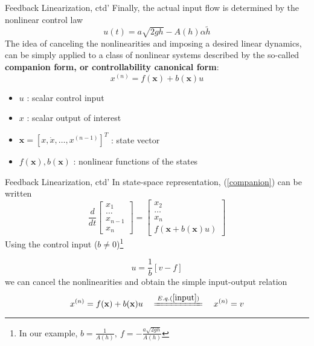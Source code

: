 \documentclass{beamer}
\begin{document}
  
  \begin{frame}{Feedback Linearization, ctd'}
  Finally, the actual input flow is determined by the nonlinear control law
  $$ u(t) = a\sqrt{2gh} - A(h)\alpha \widetilde{h} $$
    The idea of canceling the nonlinearities and imposing a desired linear dynamics, can be simply applied to a class of nonlinear systems described by the so-called \textbf{companion form, or controllability canonical form}: 
    \begin{equation}\label{companion}
      x^{(n)} = f(\textbf{x}) + b(\textbf{x})u
    \end{equation}
    \vspace{-15pt}
    \begin{itemize}
      \item $u$ : scalar control input
      \item $x$ : scalar output of interest
      \item $\textbf{x} = \left[ x,\dot{x},\dots,x^{(n-1)}\right]^{T}$ : state vector
      \item $f(\textbf{x}), b(\textbf{x})$ : nonlinear functions of the states
    \end{itemize}
  \end{frame}
  
  
  \begin{frame}{Feedback Linearization, ctd'}
  In state-space representation, (\ref{companion}) can be written
  $$
  \frac{d}{dt}\left[\begin{array}{c}
                      x_{1} \\
                      \dots \\
                      x_{n-1} \\
                      x_{n}
                    \end{array}\right] = \left[\begin{array}{c}
                                                 x_{2} \\
                                                 \dots \\
                                                 x_{n} \\
                                                 f(\textbf{x}+b(\textbf{x})u)
                                               \end{array}\right]
  $$
  Using the control input ($b \neq 0$)\footnote{In our example, $b=\frac{1}{A(h)}, ~ f=-\frac{a\sqrt{2gh}}{A(h)}$}
  
  \begin{equation}\label{input}
    u = \frac{1}{b}\left[v-f\right]
  \end{equation}
  we can cancel the nonlinearities and obtain the simple input-output relation
  $$ x^{(n)} = f(\textbf{x}) + b(\textbf{x})u \quad \xlongequal{E.q.(\ref{input})} \quad x^{(n)} = v $$
  \end{frame}
  
\end{document}
